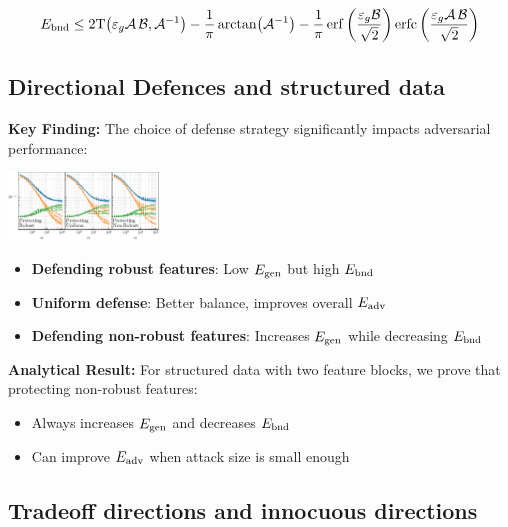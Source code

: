 \documentclass[a0paper,fleqn]{betterportraitposter}
\theoremstyle{plain}
\theoremstyle{definition}
\theoremstyle{remark}
\begin{document}
{\begin{multicols}{3}
\begin{equation}
    \bounderr \leq 2 \mathrm{T}\qty( \advgencost \mathcal{A} \, \mathcal{B}, \mathcal{A}^{-1} ) - \frac{1}{\pi} \arctan( \mathcal{A}^{-1} ) - \frac{1}{\pi} \erf\qty( \frac{\advgencost \mathcal{B}}{\sqrt{2}} ) \erfc\qty( \frac{\advgencost \mathcal{A} \, \mathcal{B}}{\sqrt{2}} )
    \label{eq:bound-boundary-error}
\end{equation}

\subsection{Directional Defences and structured data}

\textbf{Key Finding:} The choice of defense strategy significantly impacts adversarial performance:

\begin{center}
\includegraphics[width=0.3\textwidth]{Assets/defence_sweep.pdf}
\end{center}

\begin{itemize}
    \item \textbf{Defending robust features}: Low $E_{\mathrm{gen}}$ but high $E_{\mathrm{bnd}}$
    \item \textbf{Uniform defense}: Better balance, improves overall $E_{\mathrm{adv}}$
    \item \textbf{Defending non-robust features}: Increases $E_{\mathrm{gen}}$ while decreasing $E_{\mathrm{bnd}}$
\end{itemize}

\textbf{Analytical Result:} For structured data with two feature blocks, we prove that protecting non-robust features:
\begin{itemize}
    \item Always increases $E_{\mathrm{gen}}$ and decreases $E_{\mathrm{bnd}}$
    \item Can improve $E_{\mathrm{adv}}$ when attack size is small enough
\end{itemize}

\subsection{Tradeoff directions and innocuous directions}


\end{multicols}}
\end{document}
